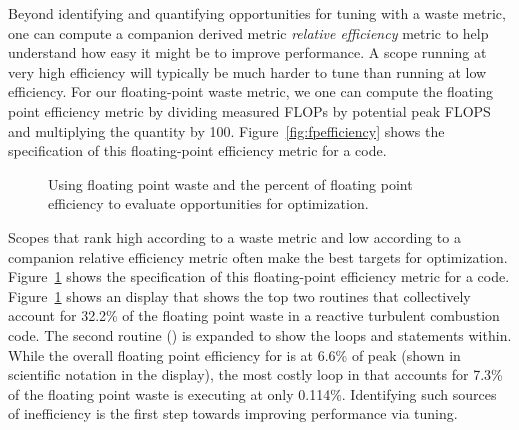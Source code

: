 \documentclass[11pt,letterpaper]{report}
\begin{document}
Beyond identifying and quantifying opportunities for tuning with a waste metric, one can compute a companion derived metric {\em relative efficiency} metric to help understand how easy it might be to improve performance.
A scope running at very high efficiency will typically be much harder to tune than running at low efficiency.
For our floating-point waste metric, we one can compute the floating point efficiency metric by dividing measured FLOPs by potential peak FLOPS and multiplying the quantity by 100.
Figure~\ref{fig:fpefficiency} shows the specification of this floating-point efficiency metric for a code.

\begin{figure}[t]
\caption{Using floating point waste and the percent of floating point efficiency to evaluate opportunities for optimization.}
\label{fig:fpefficiency-loop}
\end{figure}

Scopes that rank high according to a waste metric and low according to a companion relative efficiency metric often make the best targets for optimization.
Figure~\ref{fig:fpefficiency-loop} shows the specification of this floating-point efficiency metric for a code.
Figure~\ref{fig:fpefficiency-loop} shows an \hpcviewer{} display that shows the top two routines that collectively account for 32.2\% of the floating point waste in a reactive turbulent combustion code.
The second routine () is expanded to show the loops and statements within.
While the overall floating point efficiency for  is at 6.6\% of peak (shown in scientific notation in the \hpcviewer{} display), the most costly loop in  that accounts for 7.3\% of the floating point waste is executing at only 0.114\%.
 Identifying such sources of inefficiency is the first step towards improving performance via tuning.
\end{document}
